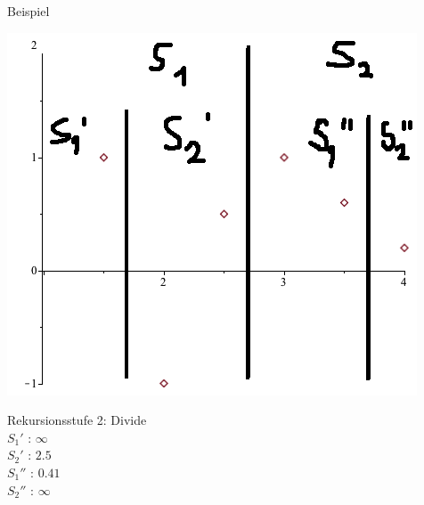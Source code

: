 \documentclass[18pt]{beamer}
\begin{document}
		\begin{frame}{Beispiel}
			\begin{minipage}{0.45\textwidth}
				\includegraphics[width =\textwidth]{logos/PlotsBetter02.png}
			\end{minipage}
			\begin{minipage}{0.45\textwidth}
				Rekursionsstufe 2: Divide\\
				$S_1'  \text{ : }  \infty$ \\	
				$S_2'  \text{ : }  2.5 $ \\
				$S_1''  \text{ : }  0.41$ \\
				$S_2''  \text{ : }  \infty$		
			\end{minipage}
		\end{frame}
\end{document}
